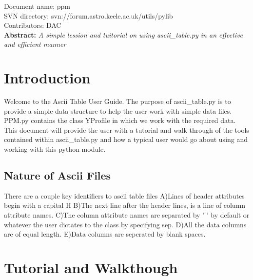 \renewcommand{\ndoctitle}{ascii\_table.py: Simple Ascii Table Data Structure} 
\renewcommand{\ndocname}{ppm}                      
\renewcommand{\svndir}{svn://forum.astro.keele.ac.uk/utils/pylib}  
\renewcommand{\ndoccontribs}{DAC}



Document name: \ndocname \\
SVN directory: \svndir\\
Contributors: \ndoccontribs\\



{  \textbf{Abstract:} \slshape
A simple lession and tuitorial on using ascii\_table.py in an effective and efficient manner
}

\section{Introduction}
Welcome to the Ascii Table User Guide.  The purpose of ascii\_table.py is
to provide a simple data structure to help the user work with simple data files. 
PPM.py contains the class YProfile in which we work with the required data.
This document will provide the user with a 
tutorial and walk through of the tools contained within ascii\_table.py and
how a typical user would go about using and working with this python module.
\subsection{Nature of Ascii Files}
There are a couple key identifiers to ascii table files \newline
A)Lines of header attributes begin with a capital H \newline
B)The next line after the header lines, is a line of column attribute names.\newline
C)The column attribute names are separated by '  ' by default or whatever the 
user dictates to the class by specifying sep.\newline
D)All the data columns are of equal length.\newline
E)Data columns are seperated by blank spaces.\newline
\section{Tutorial and Walkthough}

